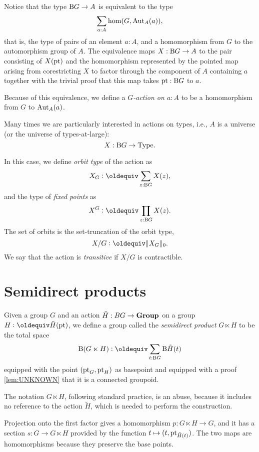 Notice that the type $\mathrm B G \to A$ is equivalent to the type
\[
  \sum_{a:A}\hom(G,\operatorname{Aut}_A(a)),
\]
that is, the type of pairs of an element $a : A$,
and a homomorphism from $G$ to the automorphism group of $A$.
The equivalence maps $X:\mathrm B G\to A$ to the pair consisting of $X({\mathord{\mathrm{pt}}})$
and the homomorphism represented by the pointed map arising
from corestricting $X$ to factor through the component of $A$ containing $a$
together with the trivial proof that this map takes ${\mathord{\mathrm{pt}}}:\mathrm B G$ to $a$.

Because of this equivalence,
we define a \emph{$G$-action on $a:A$}
to be a homomorphism from $G$ to $\operatorname{Aut}_A(a)$.

Many times we are particularly interested in actions on types,
i.e., $A$ is a universe (or the universe of types-at-large):
\[
  X : \mathrm B G \to \mathord{\mathrm{Type}}.
\]

In this case, we define \emph{orbit type} of the action as
\[
  X_G \defeq \sum_{z:\B G} X(z),
\]
and the type of \emph{fixed points} as
\[
  X^G \defeq \prod_{z:\B G} X(z).
\]
The set of orbits is the set-truncation of the orbit type,
\[
  X / G \defeq \Trunc{X_G}_0.
\]
We say that the action is \emph{transitive} if $X / G$ is contractible.

\section{Semidirect products}
\label{sec:Semidirect-products}

\begin{definition}\label{def:semidirect-product}
  Given a group $G$ and an action $\tilde H : BG \to \mathbf{Group}$ on a group $H \defeq \tilde H(\pt)$, we define a group called the {\em
    semidirect product}
  $G \ltimes H$ to be the total space
  $$\Bop ( G \ltimes H ) \defeq \sum_{t:\B G} \B \tilde H(t)$$
  equipped with the point $({\mathord{\mathrm{pt}}}_G,{\mathord{\mathrm{pt}}}_H)$ as basepoint and equipped with a proof \cref{lem:UNKNOWN} that it is a connected groupoid.
\end{definition}

The notation $G \ltimes H$, following standard practice, is an abuse, because it includes no reference to the action $\tilde H$, which is needed
to perform the construction.

Projection onto the first factor gives a homomorphism $p : G \ltimes H \to G$, and it has a section $s : G \to G \ltimes H$ provided by the
function $t \mapsto (t,{\mathord{\mathrm{pt}}}_{\tilde H(t)})$.  The two maps are homomorphisms because they preserve the base points.

